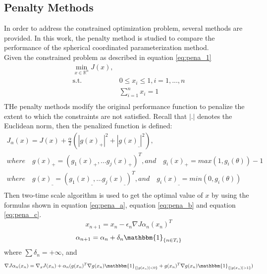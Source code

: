 \documentclass[a4paper,12pt]{article}
\begin{document}
\subsection{Penalty Methods}
In order to address the constrained optimization problem, several methods are provided. In this work, the penalty method is studied to compare the performance of the spherical coordinated parameterization method.\\
Given the constrained problem as described in equation \ref{eq:pena_1}
\begin{equation}\label{eq:pena_1}
\begin{aligned}
\min_{x\in \mathbb{R}^n}J(x), \\
\textrm{s.t.} \quad & 0 \leq x_i \leq 1, i=1,...,n\\
              \quad & \sum_{i=1}^{n} x_i = 1\\
\end{aligned}
\end{equation}
THe penalty methods modify the original performance function to penalize the extent to which the constraints are not satisfied. Recall that $|.|$ denotes the Euclidean norm, then the penalized function is defined:\\
\begin{equation} \label{eq:pena_2}
\begin{aligned}
J_{\alpha}(x) = J(x)+\frac{\alpha}{2}(|g(x)_{+}|^2+|g(x)_{\_}|^2),\\
where \quad g(x)_{+} =(g_1(x)_{+},...g_j(x)_{+})^T, and \quad g_i(x)_{+} = max(1,g_i(\theta))-1\\
where \quad g(x)_{\_} =(g_1(x)_{\_},...g_j(x)_{\_})^T, and \quad g_i(x)_{\_} = min(0,g_i(\theta))\\
\end{aligned}
\end{equation}
Then two-time scale algorithm is used to get the optimal value of $x$ by using the formulas shown in equation \ref{eq:pena_a}, equation \ref{eq:pena_b} and equation \ref{eq:pena_c}. \\
\begin{equation} \label{eq:pena_a}
x_{n+1}=x_n-\epsilon _n \nabla J{\alpha_ n}(x_n)^T
\end{equation}
\begin{equation}\label{eq:pena_b}
\alpha_{n+1}=\alpha_n+\delta _n \mathbbm{1} _{\{n\in {T_i}\}}
\end{equation}
where $\sum \delta_n = + \infty$, and\\
\begin{equation}\label{eq:pena_c}
\nabla J{\alpha_ n}(x_n) =\nabla _x J(x_n)+\alpha_n(g(x_n)^T \nabla g(x_n) \mathbbm{1}_{\{|g(x_n)|<0\}}+g(x_n)^T \nabla g(x_n) \mathbbm{1}_{\{|g(x_n)|>1\}})
\end{equation}
\end{document}
